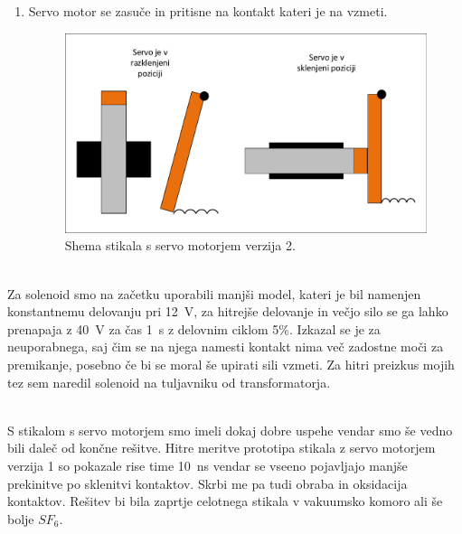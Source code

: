 \documentclass[a4paper,twoside,openright,12pt,Slovene]{book}
\begin{document}
\begin{enumerate}
    \item  Servo motor se zasuče in pritisne na kontakt kateri je na vzmeti.
    \begin{figure}[H]
        \centering
        \includegraphics[width=1\columnwidth]{Sheme/StikaloServoVerzija2.pdf}
        \caption{\label{StikaloServoVerzija2} Shema stikala s servo motorjem verzija 2.}
    \end{figure}
\end{enumerate}


    ~\\Za solenoid smo na začetku uporabili manjši model, kateri je bil namenjen konstantnemu delovanju pri \SI{12}{\volt}, za hitrejše delovanje in večjo silo se ga lahko prenapaja z  \SI{40}{\volt} za čas  \SI{1}{\second} z delovnim ciklom 5\%. Izkazal se je za neuporabnega, saj čim se na njega namesti kontakt nima več zadostne moči za premikanje, posebno če bi se moral še upirati sili vzmeti. Za hitri preizkus mojih tez sem naredil solenoid na tuljavniku od transformatorja.
    
    ~\\S stikalom s servo motorjem smo imeli dokaj dobre uspehe vendar smo še vedno bili daleč od končne rešitve. Hitre meritve prototipa stikala z servo motorjem verzija 1 so pokazale rise time  \SI{10}{\nano\second} vendar se vseeno pojavljajo manjše prekinitve po sklenitvi kontaktov. Skrbi me pa tudi obraba in oksidacija kontaktov. Rešitev bi bila zaprtje celotnega stikala v vakuumsko komoro ali še bolje $SF_{6}$.
    
\end{document}
